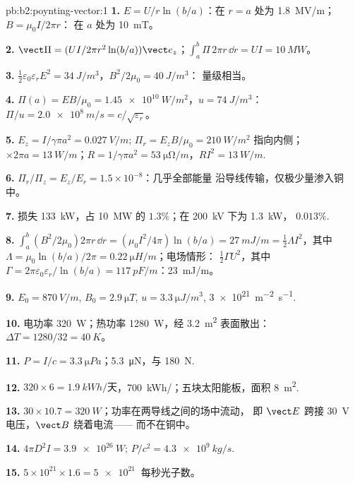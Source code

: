 \begin{solution}{pb:b2:poynting-vector:1}
\textbf{1.} $E = U/r\ln(b/a)$：在 $r = a$ 处为 \qty{1.8}{MV/m}；$B = \mu_0I/2\pi r$：
在 $a$ 处为 \qty{10}{mT}。

\textbf{2.} $\vect\Pi = (UI/2\pi r^2\ln(b/a))\vect e_z$；$\int_a^b\Pi\,2\pi r\,\dd r = UI =
\qty{10}{MW}$。

\textbf{3.} $\tfrac12\varepsilon_0\varepsilon_rE^2 = \qty{34}{J/m^3}$，$B^2/2\mu_0 = \qty{40}{J/m^3}$：
量级相当。

\textbf{4.} $\Pi(a) = EB/\mu_0 = \qty{1.45e10}{W/m^2}$，$u = \qty{74}{J/m^3}$：$\Pi/u =
\qty{2.0e8}{m/s} = c/\sqrt{\varepsilon_r}$。

\textbf{5.} $E_z = I/\gamma\pi a^2 = \qty{0.027}{V/m}$; $\Pi_r = E_zB/\mu_0 = \qty{210}{W/m^2}$
指向内侧；$\times2\pi a = \qty{13}{W/m}$；$R = 1/\gamma\pi a^2 = \qty{53}{\micro\ohm/m}$，$RI^2 =
\qty{13}{W/m}$.

\textbf{6.} $\Pi_r/\Pi_z = E_z/E_r = 1.5 \times 10^{-8}$：几乎全部能量
沿导线传输，仅极少量渗入铜中。

\textbf{7.} 损失 \qty{133}{kW}，占 \qty{10}{MW} 的 $1.3\%$；在 \qty{200}{kV} 下为 \qty{1.3}{kW}，
$0.013\%$.

\textbf{8.} $\int_a^b(B^2/2\mu_0)2\pi r\,\dd r = (\mu_0I^2/4\pi)\ln(b/a) = \qty{27}{mJ/m} =
\tfrac12\Lambda I^2$，其中 $\Lambda = \mu_0\ln(b/a)/2\pi = \qty{0.22}{\micro H/m}$；电场情形：
$\tfrac12\Gamma U^2$，其中 $\Gamma = 2\pi\varepsilon_0\varepsilon_r/\ln(b/a) = \qty{117}{pF/m}$：\qty{23}{mJ/m}。

\textbf{9.} $E_0 = \qty{870}{V/m}$, $B_0 = \qty{2.9}{\micro T}$, $u = \qty{3.3}{\micro J/m^3}$,
\qty{3e21}{m^{-2}.s^{-1}}.

\textbf{10.} 电功率 \qty{320}{W}；热功率 \qty{1280}{W}，经 \qty{3.2}{m^2}
表面散出：$\Delta T = 1280/32 = \qty{40}{K}$。

\textbf{11.} $P = I/c = \qty{3.3}{\micro Pa}$；\qty{5.3}{\micro N}，与
\qty{180}{N}.

\textbf{12.} $320 \times 6 = \qty{1.9}{kWh/\text{天}}$，\qty{700}{kWh/}；五块太阳能板，面积
\qty{8}{m^2}.

\textbf{13.} $30 \times 10.7 = \qty{320}{W}$；功率在两导线之间的场中流动，
即 $\vect E$ 跨接 \qty{30}{V} 电压，$\vect B$ 绕着电流——
而不在铜中。

\textbf{14.} $4\pi D^2I = \qty{3.9e26}{W}$; $P/c^2 = \qty{4.3e9}{kg/s}$.

\textbf{15.} $5 \times 10^{21} \times 1.6 = \qty{5e21}{}$ 每秒光子数。


\end{solution}
